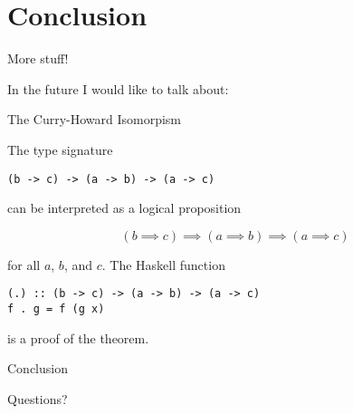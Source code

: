
\section{Conclusion}

%
\begin{frame}{More stuff!}

In the future I would like to talk about:

\end{frame}

%
\begin{frame}[fragile]{The Curry-Howard Isomorpism}

The type signature

\begin{block}{}
\begin{verbatim}
(b -> c) -> (a -> b) -> (a -> c)
\end{verbatim}
\end{block}

can be interpreted as a logical proposition

\begin{block}{}
\[
(b \implies c) \implies (a \implies b) \implies (a \implies c)
\]
\end{block}

for all $a$, $b$, and $c$. The Haskell function

\begin{block}{}
\begin{verbatim}
(.) :: (b -> c) -> (a -> b) -> (a -> c)
f . g = f (g x)
\end{verbatim}
\end{block}

is a proof of the theorem.

\end{frame}

%
\begin{frame}{Conclusion}

Questions?

\end{frame}
